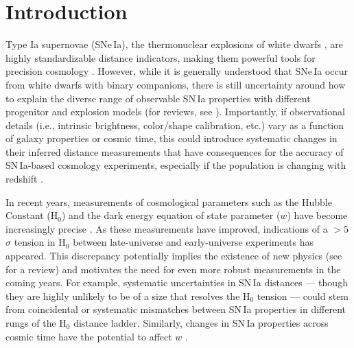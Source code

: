 \documentclass[twocolumn,twocolappendix, linenumbers]{aastex631} %
\begin{document}
\section{Introduction} \label{intro}
Type Ia supernovae (SNe\,Ia), the thermonuclear explosions of white dwarfs \citep{Hoyle60}, are highly standardizable distance indicators, making them powerful tools for precision cosmology \citep{Riess98,Perlmutter99}. However, while it is generally understood that SNe\,Ia occur from white dwarfs with binary companions, there is still uncertainty around how to explain the diverse range of observable SN\,Ia properties with different progenitor and explosion models (for reviews, see \citealt{Maoz14,Maeda16,Livio18,Jha19}). Importantly, if observational details (i.e., intrinsic brightness, color/shape calibration, etc.) vary as a function of galaxy properties or cosmic time, this could introduce systematic changes in their inferred distance measurements that have consequences for the accuracy of SN\,Ia-based cosmology experiments, especially if the population is changing with redshift  \citep[e.g.,][]{Childress14,Jones18,Rose19,Rigault20,Brout21,Nicolas21,Kelsey22,Thorp22,Kelsey23,Wiseman23}.

In recent years, measurements of cosmological parameters such as the Hubble Constant (H$_0$) and the dark energy equation of state parameter ($w$) have become increasingly precise \citep{Betoule14,Riess16,Burns18,Scolnic18,Freedman19,Jones19,Brout22,Riess22,Dhawan23,Garnavich23,Rubin23,Uddin23}. 
As these measurements have improved, indications of a $>$5$\sigma$ tension in H$_0$ between late-universe \citep{Riess22} and early-universe \citep{Planck18} experiments has appeared. This discrepancy potentially implies the existence of new physics (see \citealp{DiValentino21} for a review) and motivates the need for even more robust measurements in the coming years. For example, systematic uncertainties in SN\,Ia distances --- though they are highly unlikely to be of a size that resolves the H$_0$ tension \citep{Dhawan20} --- could stem from coincidental or systematic mismatches between SN\,Ia properties in different rungs of the H$_0$ distance ladder.  Similarly, changes in SN\,Ia properties across cosmic time have the potential to affect $w$ \citep[e.g.,][]{Pan22}.
\end{document}
